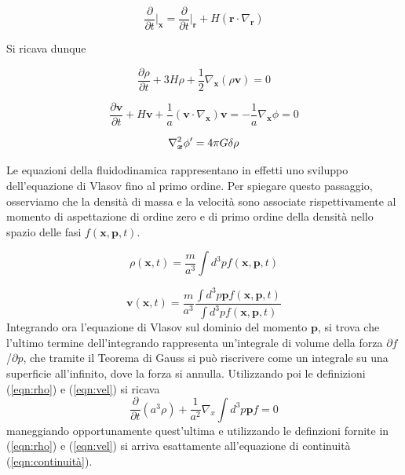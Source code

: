 \begin{equation}
    \frac{\partial}{\partial t}\biggr|_{\bm{x}} = \frac{\partial}{\partial t}\biggr|_{\bm{r}} + H(\bm{r} \cdot \nabla_{\bm{r}})
\end{equation}

Si ricava dunque

\begin{equation}
    \label{eqn:continuitax}
    \frac{\partial\rho}{\partial t} + 3H\rho +\frac{1}{2}\nabla_{\bm{x}}(\rho\bm{v}) = 0
\end{equation}

\begin{equation}
    \label{eqn:eulerox}
    \frac{\partial \bm{v}}{\partial t} + H \bm{v} + \frac{1}{a}(\bm{v}\cdot\nabla_{\bm{x}})\bm{v} = -\frac{1}{a}\nabla_{\bm{x}}\phi = 0
\end{equation}

\begin{equation}
    \label{eqn:poissonx}
    \laplacian_{\bm{x}}\phi{'} = 4\pi G \delta\rho
\end{equation}

Le equazioni della fluidodinamica rappresentano in effetti uno sviluppo dell'equazione 
di Vlasov fino al primo ordine. Per spiegare questo passaggio, osserviamo che la densità
di massa e la velocità sono associate rispettivamente al momento di aspettazione di ordine 
zero e di primo ordine della densità nello spazio delle fasi $f(\bm{x}, \bm{p}, t)$.

\begin{equation}
    \label{eqn:rho}
    \rho(\bm{x}, t) = \frac{m}{a^3}\int d^3p f(\bm{x}, \bm{p}, t)
\end{equation}

\begin{equation}
    \label{eqn:vel}
    \bm{v}(\bm{x}, t) = \frac{m}{a^3}\frac{\int d^3p \bm{p}f(\bm{x}, \bm{p}, t)}{\int d^3p f(\bm{x}, \bm{p}, t)}
\end{equation}
Integrando ora l'equazione di Vlasov sul dominio del momento $\bm{p}$, si trova che l'ultimo termine
dell'integrando rappresenta un'integrale di volume della forza $\partial f$/$\partial p$, che tramite
il Teorema di Gauss si può riscrivere come un integrale su una superficie all'infinito, dove la forza
si annulla. Utilizzando poi le definizioni (\ref{eqn:rho}) e (\ref{eqn:vel}) si ricava 
\begin{equation}
    \frac{\partial}{\partial t}(a^3 \rho) + \frac{1}{a^2}\nabla_x \int d^3 p \bm{p} f = 0
\end{equation}
maneggiando opportunamente quest'ultima e utilizzando le definzioni fornite in (\ref{eqn:rho}) e (\ref{eqn:vel})
si arriva esattamente all'equazione di continuità (\ref{eqn:continuità}).

